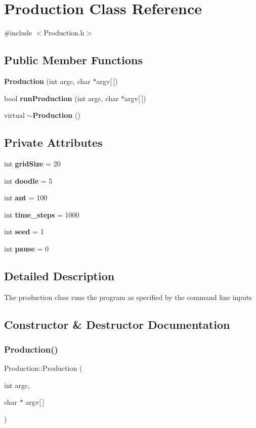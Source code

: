 \section{Production Class Reference}
\label{classProduction}


{\ttfamily \#include $<$Production.\+h$>$}

\subsection*{Public Member Functions}
\begin{DoxyCompactItemize}
\item 
\textbf{ Production} (int argc, char $\ast$argv[$\,$])
\item 
bool \textbf{ run\+Production} (int argc, char $\ast$argv[$\,$])
\item 
virtual \textbf{ $\sim$\+Production} ()
\end{DoxyCompactItemize}
\subsection*{Private Attributes}
\begin{DoxyCompactItemize}
\item 
int \textbf{ grid\+Size} = 20
\item 
int \textbf{ doodle} = 5
\item 
int \textbf{ ant} = 100
\item 
int \textbf{ time\+\_\+steps} = 1000
\item 
int \textbf{ seed} = 1
\item 
int \textbf{ pause} = 0
\end{DoxyCompactItemize}


\subsection{Detailed Description}
The production class runs the program as specified by the command line inputs 

\subsection{Constructor \& Destructor Documentation}
\mbox{\label{classProduction_a24439558b7672feaea80dc0ab1b53ff2}} 
\subsubsection{Production()}
{\footnotesize\ttfamily Production\+::\+Production (\begin{DoxyParamCaption}\item[{int}]{argc,  }\item[{char $\ast$}]{argv[$\,$] }\end{DoxyParamCaption})}

